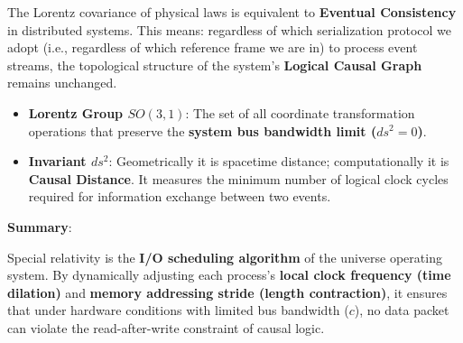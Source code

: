 \begin{theorem}
The Lorentz covariance of physical laws is equivalent to \textbf{Eventual Consistency} in distributed systems. This means: regardless of which serialization protocol we adopt (i.e., regardless of which reference frame we are in) to process event streams, the topological structure of the system's \textbf{Logical Causal Graph} remains unchanged.

\begin{itemize}
\item \textbf{Lorentz Group $SO(3,1)$}: The set of all coordinate transformation operations that preserve the \textbf{system bus bandwidth limit ($ds^2 = 0$)}.

\item \textbf{Invariant $ds^2$}: Geometrically it is spacetime distance; computationally it is \textbf{Causal Distance}. It measures the minimum number of logical clock cycles required for information exchange between two events.
\end{itemize}
\end{theorem}

\textbf{Summary}:

Special relativity is the \textbf{I/O scheduling algorithm} of the universe operating system. By dynamically adjusting each process's \textbf{local clock frequency (time dilation)} and \textbf{memory addressing stride (length contraction)}, it ensures that under hardware conditions with limited bus bandwidth ($c$), no data packet can violate the read-after-write constraint of causal logic.
